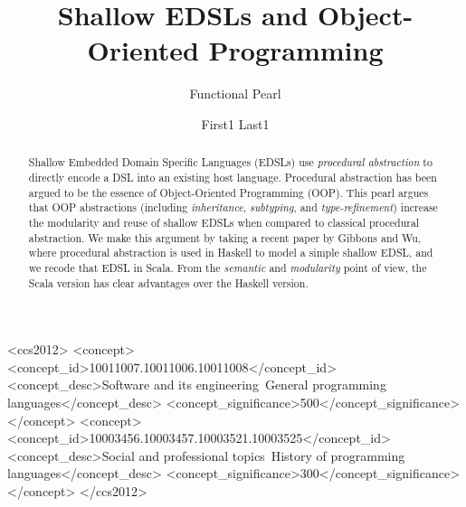 \documentclass[acmlarge, anonymous, review]{acmart}\settopmatter{printfolios=true}
\begin{document}
\title{Shallow EDSLs and Object-Oriented Programming}
\subtitle{Functional Pearl}
\author{First1 Last1}

\begin{abstract}
Shallow Embedded Domain Specific Languages (EDSLs) use
\emph{procedural abstraction} to directly encode a DSL into an existing host language. Procedural abstraction has
been argued to be the essence of Object-Oriented Programming (OOP).
This pearl argues that OOP abstractions
(including \emph{inheritance}, \emph{subtyping}, and
\emph{type-refinement})
increase the modularity and reuse of shallow
EDSLs when compared to classical procedural abstraction. We make this
argument by taking a recent paper by Gibbons and Wu, where procedural
abstraction is used in Haskell to model a simple shallow EDSL, and we recode
that EDSL in Scala. From the \emph{semantic}
and \emph{modularity} point of view, the Scala version has clear advantages
over the Haskell version.
\end{abstract}

\begin{CCSXML}
<ccs2012>
<concept>
<concept_id>10011007.10011006.10011008</concept_id>
<concept_desc>Software and its engineering~General programming languages</concept_desc>
<concept_significance>500</concept_significance>
</concept>
<concept>
<concept_id>10003456.10003457.10003521.10003525</concept_id>
<concept_desc>Social and professional topics~History of programming languages</concept_desc>
<concept_significance>300</concept_significance>
</concept>
</ccs2012>
\end{CCSXML}



\maketitle













\end{document}
